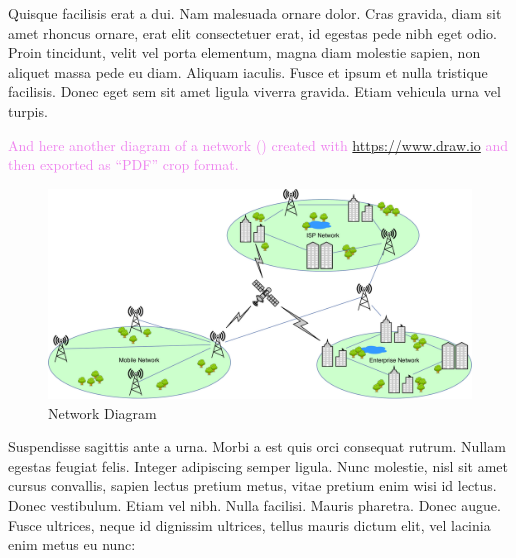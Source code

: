 Quisque facilisis erat a dui. Nam malesuada ornare dolor. Cras gravida, diam sit amet rhoncus ornare, erat elit consectetuer erat, id egestas pede nibh eget odio. Proin tincidunt, velit vel porta elementum, magna diam molestie sapien, non aliquet massa pede eu diam. Aliquam iaculis. Fusce et ipsum et nulla tristique facilisis. Donec eget sem sit amet ligula viverra gravida. Etiam vehicula urna vel turpis. 

\textcolor{violet}{And here another diagram of a network () created with \url{https://www.draw.io} and then exported as ``PDF'' crop format.}

\begin{figure}[h]
\centering
\includegraphics[width=1.0\textwidth]{./Images/Network_from_draw-io.pdf}
\caption{Network Diagram}
\label{fig:network}
\end{figure}

Suspendisse sagittis ante a urna. Morbi a est quis orci consequat rutrum. Nullam egestas feugiat felis. Integer adipiscing semper ligula. Nunc molestie, nisl sit amet cursus convallis, sapien lectus pretium metus, vitae pretium enim wisi id lectus. Donec vestibulum. Etiam vel nibh. Nulla facilisi. Mauris pharetra. Donec augue. Fusce ultrices, neque id dignissim ultrices, tellus mauris dictum elit, vel lacinia enim metus eu nunc:

